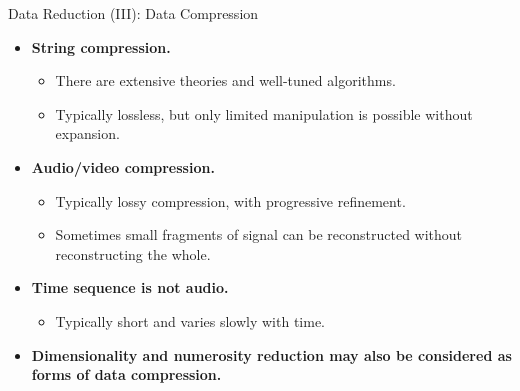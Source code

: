 \begin{frame}{Data Reduction (III): Data Compression}
	\begin{itemize}
		\item \textbf{String compression.}
		\begin{itemize}
			\item There are extensive theories and well-tuned algorithms.
			\item Typically lossless, but only limited manipulation is possible 
			without expansion.
		\end{itemize}
		\item \textbf{Audio/video compression.}
		\begin{itemize}
			\item Typically lossy compression, with progressive refinement.
			\item Sometimes small fragments of signal can be reconstructed 
			without reconstructing the whole.
		\end{itemize}
		\item \textbf{Time sequence is not audio.}
		\begin{itemize}
			\item Typically short and varies slowly with time.
		\end{itemize}
		\item \textbf{Dimensionality and numerosity reduction may also be 
		considered as forms of data compression.}
	\end{itemize}
\end{frame}